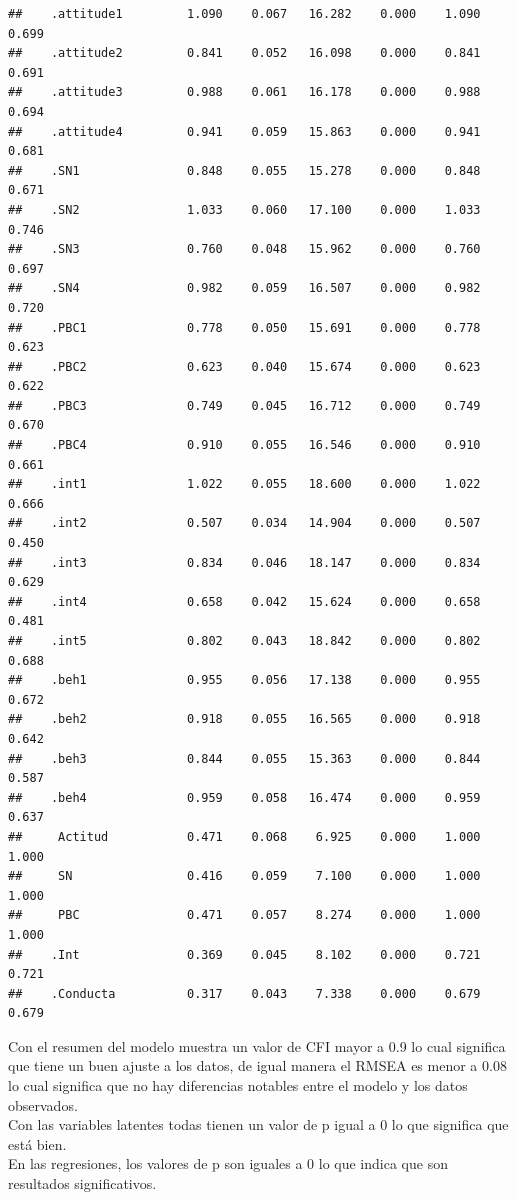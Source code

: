 \documentclass[
]{article}
\begin{document}
\begin{verbatim}
##    .attitude1         1.090    0.067   16.282    0.000    1.090    0.699
##    .attitude2         0.841    0.052   16.098    0.000    0.841    0.691
##    .attitude3         0.988    0.061   16.178    0.000    0.988    0.694
##    .attitude4         0.941    0.059   15.863    0.000    0.941    0.681
##    .SN1               0.848    0.055   15.278    0.000    0.848    0.671
##    .SN2               1.033    0.060   17.100    0.000    1.033    0.746
##    .SN3               0.760    0.048   15.962    0.000    0.760    0.697
##    .SN4               0.982    0.059   16.507    0.000    0.982    0.720
##    .PBC1              0.778    0.050   15.691    0.000    0.778    0.623
##    .PBC2              0.623    0.040   15.674    0.000    0.623    0.622
##    .PBC3              0.749    0.045   16.712    0.000    0.749    0.670
##    .PBC4              0.910    0.055   16.546    0.000    0.910    0.661
##    .int1              1.022    0.055   18.600    0.000    1.022    0.666
##    .int2              0.507    0.034   14.904    0.000    0.507    0.450
##    .int3              0.834    0.046   18.147    0.000    0.834    0.629
##    .int4              0.658    0.042   15.624    0.000    0.658    0.481
##    .int5              0.802    0.043   18.842    0.000    0.802    0.688
##    .beh1              0.955    0.056   17.138    0.000    0.955    0.672
##    .beh2              0.918    0.055   16.565    0.000    0.918    0.642
##    .beh3              0.844    0.055   15.363    0.000    0.844    0.587
##    .beh4              0.959    0.058   16.474    0.000    0.959    0.637
##     Actitud           0.471    0.068    6.925    0.000    1.000    1.000
##     SN                0.416    0.059    7.100    0.000    1.000    1.000
##     PBC               0.471    0.057    8.274    0.000    1.000    1.000
##    .Int               0.369    0.045    8.102    0.000    0.721    0.721
##    .Conducta          0.317    0.043    7.338    0.000    0.679    0.679
\end{verbatim}

Con el resumen del modelo muestra un valor de CFI mayor a 0.9 lo cual
significa que tiene un buen ajuste a los datos, de igual manera el RMSEA
es menor a 0.08 lo cual significa que no hay diferencias notables entre
el modelo y los datos observados.\\
Con las variables latentes todas tienen un valor de p igual a 0 lo que
significa que está bien.\\
En las regresiones, los valores de p son iguales a 0 lo que indica que
son resultados significativos.
\end{document}
